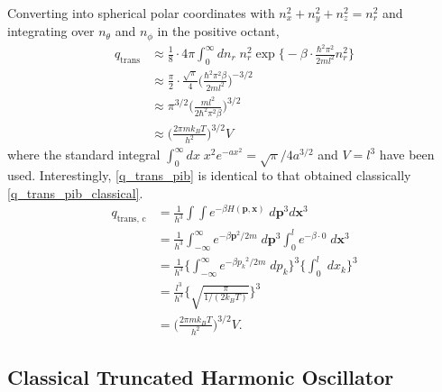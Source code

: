 \documentclass[../main.tex]{subfiles}
\begin{document}
Converting into spherical polar coordinates with $n_x^2 + n_y^2 + n_z^2 = n_r^2$ and integrating over $n_\theta$ and $n_\phi$ in the positive octant,
\begin{equation}
	\begin{aligned}
		q_\text{trans} &\approx \frac{1}{8} \cdot 4\pi \int_0^\infty dn_r\; n_r^2\exp{ {\Big \{} -{\beta}\cdot  \frac{\hbar^2 \pi^2}{2ml^2}n_r^2}{\Big \}} \\
		&\approx \frac{\pi}{2} \cdot \frac{\sqrt{\pi}}{4} {\Big (} \frac{\hbar^2 \pi^2\beta}{2ml^2} {\Big )}^{-3/2} \\
		&\approx \pi^{3/2} {\Big (} \frac{ml^2}{2\hbar^2 \pi^2\beta} {\Big )}^{3/2} \\
		&\approx {\Big (} \frac{2\pi m k_B T}{h^2} {\Big )}^{3/2} V 
		\label{q_trans_pib}
	\end{aligned}
\end{equation}
where the standard integral $\int_{0}^{\infty} dx\; x^2 e^{-ax^2} = \sqrt{\pi}/4a^{3/2}$ and $V = l^3$ have been used. Interestingly, \eqref{q_trans_pib} is identical to that obtained classically \eqref{q_trans_pib_classical}.
\begin{equation}
	\begin{aligned}
		q_\text{trans, c} &= \frac{1}{h^{3}}\int\int e^{-\beta H(\boldsymbol{p}, \boldsymbol{x})} \; d\boldsymbol{p}^{3} d\boldsymbol{x}^{3} \\
		&= \frac{1}{h^{3}}\int_{-\infty}^\infty e^{-\beta \boldsymbol{p}^2/2m} \; d\boldsymbol{p}^{3} \int_0^l e^{-\beta \cdot 0} \;  d\boldsymbol{x}^{3} \\
		&= \frac{1}{h^{3}} {\Big \{}  \int_{-\infty}^\infty e^{-\beta {p_k}^2/2m} \; d{p_k} {\Big \}}^3 {\Big \{}  \int_0^l  \;  dx_k {\Big \}}^3 \\
		&= \frac{l^3}{h^{3}} {\Big \{}  \sqrt{\frac{\pi}{1/(2 k_B T)}} {\Big \}}^3 \\
		&={\Big (} \frac{2\pi m k_B T}{h^2} {\Big )}^{3/2} V.
		\label{q_trans_pib_classical}
	\end{aligned}
\end{equation}

\subsection{Classical Truncated Harmonic Oscillator}
\end{document}
